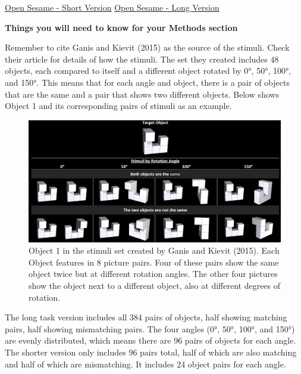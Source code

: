 \documentclass[
]{book}
\begin{document}
\href{https://github.com/jmattschey/MScConversionExperiments/blob/master/GitHub/SpatialRotationShort.zip}{Open Sesame - Short Version} \textbar{} \href{https://github.com/jmattschey/MScConversionExperiments/blob/master/GitHub/SpatialRotationLong.osexp}{Open Sesame - Long Version}

\textbf{Things you will need to know for your Methods section}

Remember to cite Ganis and Kievit (2015) as the source of the stimuli. Check their article for details of how the stimuli.
The set they created includes 48 objects, each compared to itself and a different object rotated by 0°, 50°, 100°, and 150°. This means that for each angle and object, there is a pair of objects that are the same and a pair that shows two different objects. Below shows Object 1 and its corresponding pairs of stimuli as an example.

\begin{figure}

{\centering \includegraphics[width=0.99\linewidth]{images/RotationOverview} 

}

\caption{Object 1 in the stimuli set created by Ganis and Kievit (2015). Each Object features in 8 picture pairs. Four of these pairs show the same object twice but at different rotation angles. The other four pictures show the object next to a different object, also at different degrees of rotation.}\label{fig:Figure5-2}
\end{figure}

The long task version includes all 384 pairs of objects, half showing matching pairs, half showing mismatching pairs. The four angles (0°, 50°, 100°, and 150°) are evenly distributed, which means there are 96 pairs of objects for each angle. The shorter version only includes 96 pairs total, half of which are also matching and half of which are mismatching. It includes 24 object pairs for each angle.
\end{document}

